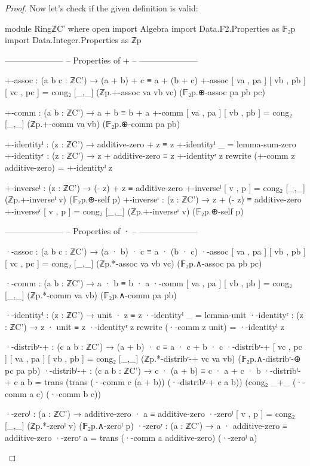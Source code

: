 \documentclass[a4paper]{report}
\theoremstyle{definition}
\begin{document}
\begin{proof}
  Now let's check if the given definition is valid:
  \begin{code}
module RingℤC' where
  open import Algebra
  import Data.F2.Properties as 𝔽₂p
  import Data.Integer.Properties as ℤp

  ---------------------
  -- Properties of + --
  ---------------------

  +-assoc : (a b c : ℤC') → (a + b) + c ≡ a + (b + c)
  +-assoc [ va , pa ] [ vb , pb ] [ vc , pc ] =
    cong₂ [_,_] (ℤp.+-assoc va vb vc) (𝔽₂p.⊕-assoc pa pb pc)

  +-comm : (a b : ℤC') → a + b ≡ b + a
  +-comm [ va , pa ] [ vb , pb ] =
    cong₂ [_,_] (ℤp.+-comm va vb) (𝔽₂p.⊕-comm pa pb)

  +-identityˡ : (z : ℤC') → additive-zero + z ≡ z
  +-identityˡ _ = lemma-sum-zero
  +-identityʳ : (z : ℤC') → z + additive-zero ≡ z
  +-identityʳ z rewrite (+-comm z additive-zero) = +-identityˡ z

  +-inverseˡ : (z : ℤC') → (- z) + z ≡ additive-zero
  +-inverseˡ [ v , p ] = cong₂ [_,_] (ℤp.+-inverseˡ v) (𝔽₂p.⊕-self p)
  +-inverseʳ : (z : ℤC') → z + (- z) ≡ additive-zero
  +-inverseʳ [ v , p ] = cong₂ [_,_] (ℤp.+-inverseʳ v) (𝔽₂p.⊕-self p)

  ---------------------
  -- Properties of · --
  ---------------------

  ·-assoc : (a b c : ℤC') → (a · b) · c ≡ a · (b · c)
  ·-assoc [ va , pa ] [ vb , pb ] [ vc , pc ] =
    cong₂ [_,_] (ℤp.*-assoc va vb vc) (𝔽₂p.∧-assoc pa pb pc)

  ·-comm : (a b : ℤC') → a · b ≡ b · a
  ·-comm [ va , pa ] [ vb , pb ] =
    cong₂ [_,_] (ℤp.*-comm va vb) (𝔽₂p.∧-comm pa pb)

  ·-identityˡ : (z : ℤC') → unit · z ≡ z
  ·-identityˡ _ = lemma-unit
  ·-identityʳ : (z : ℤC') → z · unit ≡ z
  ·-identityʳ z rewrite (·-comm z unit) = ·-identityˡ z

  ·-distribʳ-+ : (c a b : ℤC') → (a + b) · c ≡ a · c + b · c
  ·-distribʳ-+ [ vc , pc ] [ va , pa ] [ vb , pb ] =
    cong₂ [_,_] (ℤp.*-distribʳ-+ vc va vb) (𝔽₂p.∧-distribʳ-⊕ pc pa pb)
  ·-distribˡ-+ : (c a b : ℤC') → c · (a + b) ≡ c · a + c · b
  ·-distribˡ-+ c a b =
    trans (trans (·-comm c (a + b)) (·-distribʳ-+ c a b))
          (cong₂ _+_  (·-comm a c) (·-comm b c))

  ·-zeroˡ : (a : ℤC') → additive-zero · a ≡ additive-zero
  ·-zeroˡ [ v , p ] = cong₂ [_,_] (ℤp.*-zeroˡ v)  (𝔽₂p.∧-zeroˡ p)
  ·-zeroʳ : (a : ℤC') → a · additive-zero ≡ additive-zero
  ·-zeroʳ a = trans (·-comm a additive-zero) (·-zeroˡ a)


\end{code}
\end{proof}
\end{document}

